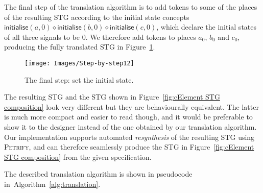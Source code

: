 \documentclass[british, journal]{IEEEtran}
\newcommand{\noun}[1]{\textsc{#1}}
\begin{document}
The final step of the translation algorithm is to add tokens to some of the places
of the resulting STG according to the initial state concepts
$\mathsf{initialise}(a,0) \diamond \mathsf{initialise}(b,0) \diamond \mathsf{initialise}(c,0)$, which declare the initial states of all three signals to be 0. We therefore
add tokens to places $a_0$, $b_0$ and $c_0$, producing the fully translated STG in
Figure~\ref{fig:step-by-step12}.

\begin{figure}[h]
\begin{centering}
\texttt{[image: Images/Step-by-step12]}
\par
\protect\caption{\label{fig:step-by-step12}The final step: set the initial state.}
\par\end{centering}
\vspace{-3mm}
\end{figure}

The resulting STG and the STG shown in Figure~\ref{fig:cElement STG composition}
look very different but they are behaviourally equivalent. The latter is much more
compact and easier to read though, and it would be preferable to show it to the
designer instead of the one obtained by our translation algorithm. Our
implementation supports automated \emph{resynthesis} of the resulting STG
using \noun{Petrify}, and can therefore seamlessly produce the STG in
Figure~\ref{fig:cElement STG composition} from the given specification.




The described translation algorithm is shown in pseudocode
in~Algorithm~\ref{alg:translation}.
\end{document}

